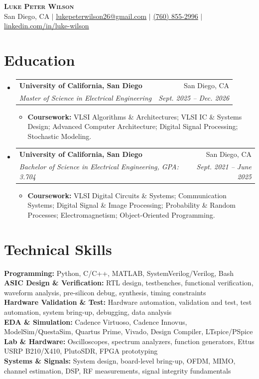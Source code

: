 \documentclass[letterpaper,10pt]{article}
\makeatletter
\newcommand{\resumeItem}[1]{\item \small{#1}}
\newcommand{\resumeSubheading}[4]{
  \vspace{1pt}\item
    \begin{tabular*}{0.97\textwidth}[t]{l@{\extracolsep{\fill}}r}
      \textbf{#1} & #2 \\
      \textit{\small #3} & \textit{\small #4} \\
    \end{tabular*}\vspace{-1pt}
}
\newcommand{\resumeItemListStart}{\begin{itemize}[leftmargin=0.18in, itemsep=0pt, topsep=1pt]}
\newcommand{\resumeItemListEnd}{\end{itemize}\vspace{-2pt}}
\newcommand{\resumeSubHeadingListStart}{\begin{itemize}[leftmargin=0.15in, label={}]}
\newcommand{\resumeSubHeadingListEnd}{\end{itemize}\vspace{-1pt}}
\makeatother
\begin{document}
\begin{center}
    \textbf{\Huge \scshape Luke Peter Wilson} \\ \vspace{2pt}
    \small San Diego, CA $|$
    \href{mailto:lukepeterwilson26@gmail.com}{\underline{lukepeterwilson26@gmail.com}} $|$
    \href{tel:+17608552996}{\underline{(760) 855-2996}} $|$
    \href{https://www.linkedin.com/in/luke-wilson-33718b238/}{\underline{linkedin.com/in/luke-wilson}}
\end{center}

\section{Education}
\resumeSubHeadingListStart
  \resumeSubheading
    {University of California, San Diego}{San Diego, CA}
    {Master of Science in Electrical Engineering}{Sept. 2025 -- Dec. 2026}
    \resumeItemListStart
      \resumeItem{\textbf{Coursework:} VLSI Algorithms \& Architectures; VLSI IC \& Systems Design; Advanced Computer Architecture; Digital Signal Processing; Stochastic Modeling.}
    \resumeItemListEnd

  \resumeSubheading
    {University of California, San Diego}{San Diego, CA}
    {Bachelor of Science in Electrical Engineering, GPA: 3.704}{Sept. 2021 -- June 2025}
    \resumeItemListStart
      \resumeItem{\textbf{Coursework:} VLSI Digital Circuits \& Systems; Communication Systems; Digital Signal \& Image Processing; Probability \& Random Processes; Electromagnetism; Object-Oriented Programming.}
    \resumeItemListEnd
\resumeSubHeadingListEnd

\section{Technical Skills}
\begin{itemize}[leftmargin=0.15in, label={}]
  \small{\item{
    \textbf{Programming:} Python, C/C++, MATLAB, SystemVerilog/Verilog, Bash \\
    \textbf{ASIC Design \& Verification:} RTL design, testbenches, functional verification, waveform analysis, pre-silicon debug, synthesis, timing constraints \\
    \textbf{Hardware Validation \& Test:} Hardware automation, validation and test, test automation, system bring-up, debugging, data analysis \\
    \textbf{EDA \& Simulation:} Cadence Virtuoso, Cadence Innovus, ModelSim/QuestaSim, Quartus Prime, Vivado, Design Compiler, LTspice/PSpice \\
    \textbf{Lab \& Hardware:} Oscilloscopes, spectrum analyzers, function generators, Ettus USRP B210/X410, PlutoSDR, FPGA prototyping \\
    \textbf{Systems \& Signals:} System design, board-level bring-up, OFDM, MIMO, channel estimation, DSP, RF measurements, signal integrity fundamentals
  }}
\end{itemize}
\end{document}
